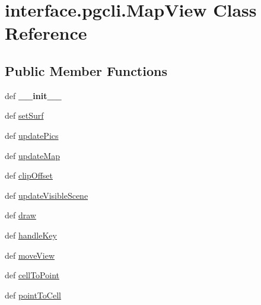 \hypertarget{classinterface_1_1pgcli_1_1_map_view}{\section{interface.\-pgcli.\-Map\-View \-Class \-Reference}
\label{classinterface_1_1pgcli_1_1_map_view}
}
\subsection*{\-Public \-Member \-Functions}
\begin{DoxyCompactItemize}
\item 
\hypertarget{classinterface_1_1pgcli_1_1_map_view_a9da806482980830e456630a655d5f51d}{def {\bfseries \-\_\-\-\_\-init\-\_\-\-\_\-}}\label{classinterface_1_1pgcli_1_1_map_view_a9da806482980830e456630a655d5f51d}

\item 
def \hyperlink{classinterface_1_1pgcli_1_1_map_view_ae910bd3f2658fefda2adb3f7991fd35b}{set\-Surf}
\item 
def \hyperlink{classinterface_1_1pgcli_1_1_map_view_a620783b72087e3d5950ce0411470390a}{update\-Pics}
\item 
def \hyperlink{classinterface_1_1pgcli_1_1_map_view_a2706f8880ed0935629fce4f413155801}{update\-Map}
\item 
def \hyperlink{classinterface_1_1pgcli_1_1_map_view_a82f2c07b04c94a8b66f83deddf37cbdd}{clip\-Offset}
\item 
def \hyperlink{classinterface_1_1pgcli_1_1_map_view_a1de1882629b6b86818849b27e8ff243c}{update\-Visible\-Scene}
\item 
def \hyperlink{classinterface_1_1pgcli_1_1_map_view_a9722a54c635d6194a598709a6d2c7b88}{draw}
\item 
def \hyperlink{classinterface_1_1pgcli_1_1_map_view_af707815529d4a3f04652224867496a3d}{handle\-Key}
\item 
def \hyperlink{classinterface_1_1pgcli_1_1_map_view_a177709a045943de34d4b2363a63da627}{move\-View}
\item 
def \hyperlink{classinterface_1_1pgcli_1_1_map_view_a24e1c5ff32a5e041cda0349b4851615b}{cell\-To\-Point}
\item 
def \hyperlink{classinterface_1_1pgcli_1_1_map_view_ae9dab6dfcd8690f77b8b4a7c8da9d73d}{point\-To\-Cell}
\end{DoxyCompactItemize}
